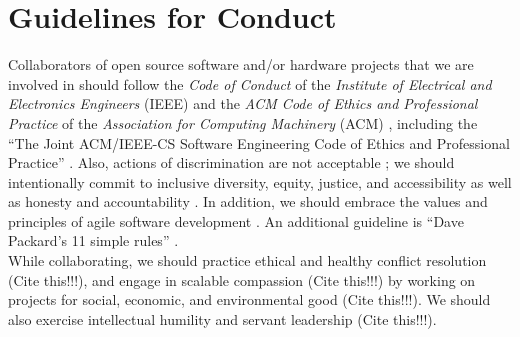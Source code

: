 \documentclass[letter,12pt]{article}
\begin{document}
\section{Guidelines for Conduct}
\label{sec:GuidelinesforConduct}



Collaborators of open source software and/or hardware projects that we are involved in should follow the {\it Code of Conduct} of the {\it Institute of Electrical and Electronics Engineers} (IEEE) \cite{deMarca2014b,deMarca2014a,deMarca2014} and the {\it ACM Code of Ethics and Professional Practice} of the {\it Association for Computing Machinery} (ACM) \cite{Gotterbarn2018b,Gotterbarn2018a,Gotterbarn2018,Brinkman2016a,ACMCouncil1992,Brinkman2017,Brinkman2016,Wolf2016,Anderson1993}, including the ``The Joint {ACM/IEEE-CS} Software Engineering Code of Ethics and Professional Practice'' \cite{Gotterbarn1999,Gotterbarn1997}. Also, actions of discrimination are not acceptable \cite{deMarca2014c}; we should intentionally commit to inclusive diversity, equity, justice, and accessibility \cite{Rich2022} as well as honesty \cite{Oluo2019,Delgado2017b,McCord2017,Molinsky2017,Reiner2016,Sandberg2014,Chang2013a,Gini2013,Rees2013,Sandberg2013,Stoker2013,Hanson2011,Maxwell2010,Lafair2009,Brach2004,Peterson2004,Putnam2000,Carnegie1936} and accountability \cite{Eitel2020,Gladwell2019,Doerr2018,ACMPublicPolicyOfficeStaff2017,Gentry2016,Molinaro2016,Fitzgerald2015,Shapiro2015a,Boehm2014,Cloud2013,Rees2013,Gary2012,Connors2011,Cushing2010,Carbajal2008,Forest2007,Godin2006,Wessner2003,Christian2020,PartnershipOnAIStaff2020,Sabeti2018,Rheem2017,TINYhrIncStaff2015,Stephens2013,Parker2012}. In addition, we should embrace the values and principles of agile software development \cite{Beedle2001a,Carter2019,Pescio1997}. An additional guideline is ``Dave Packard's 11 simple rules'' \cite{HewlettPackardCompany2012}. \\


While collaborating, we should practice ethical and healthy conflict resolution {\Huge (Cite this!!!)}, and engage in scalable compassion {\Huge (Cite this!!!)} by working on projects for social, economic, and environmental good {\Huge (Cite this!!!)}. We should also exercise intellectual humility and servant leadership {\Huge (Cite this!!!)}. \\
\end{document}
